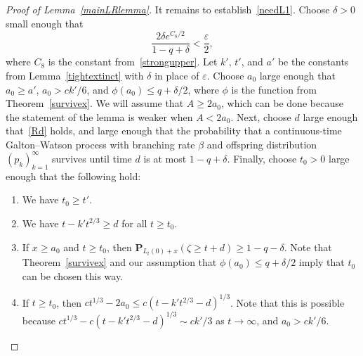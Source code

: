 \documentclass[AHL,Unicode,longabstracts,published]{cedram}
\newcommand*\eps{\varepsilon}
\renewcommand*\P{\mathbf{P}}
\newcommand{\1} {\mathds{1}}
\begin{document}
\begin{proof}[Proof of Lemma~\ref{mainLRlemma}]
It remains to establish~\eqref{needL1}. Choose $\delta > 0$ small enough that
\begin{equation}\label{deltadef}
\frac{2 \delta e^{C_8/2}}{1 - q + \delta} < \frac{\eps}{2},
\end{equation}
where $C_8$ is the constant from~\eqref{strongupper}. Let $k'$, $t'$, and $a'$ be the constants from Lemma~\ref{tightextinct} with $\delta$ in place of $\eps$. Choose $a_0$ large enough that $a_0 \geq a'$, $a_0 > ck'/6$, and $\phi(a_0) \leq q + \delta/2$, where $\phi$ is the function from Theorem~\ref{survivex}. We will assume that $A \geq 2a_0$, which can be done because the statement of the lemma is weaker when $A < 2a_0$. Next, choose $d$ large enough that~\eqref{Rd} holds, and large enough that the probability that a continuous-time Galton--Watson process with branching rate $\beta$ and offspring distribution $(p_k)_{k=1}^{\infty}$ survives until time $d$ is at most $1 - q + \delta$. Finally, choose $t_0 > 0$ large enough that the following hold:
\begin{enumerate}
\item We have $t_0 \geq t'$.

\item We have $t - k't^{2/3} \geq d$ for all $t \geq t_0$.

\item If $x \geq a_0$ and $t \geq t_0$, then $\P_{L_t(0) + x}(\zeta \geq t + d) \geq 1 - q - \delta$. Note that Theorem~\ref{survivex} and our assumption that $\phi(a_0) \leq q + \delta/2$ imply that $t_0$ can be chosen this way.

\item If $t \geq t_0$, then $ct^{1/3} - 2a_0 \leq c(t - k' t^{2/3} - d)^{1/3}$. Note that this is possible because $ct^{1/3} - c(t - k't^{2/3} - d)^{1/3} \sim ck'/3$ as $t \rightarrow \infty$, and $a_0 > ck'/6$.
\end{enumerate}


\end{proof}
\end{document}
